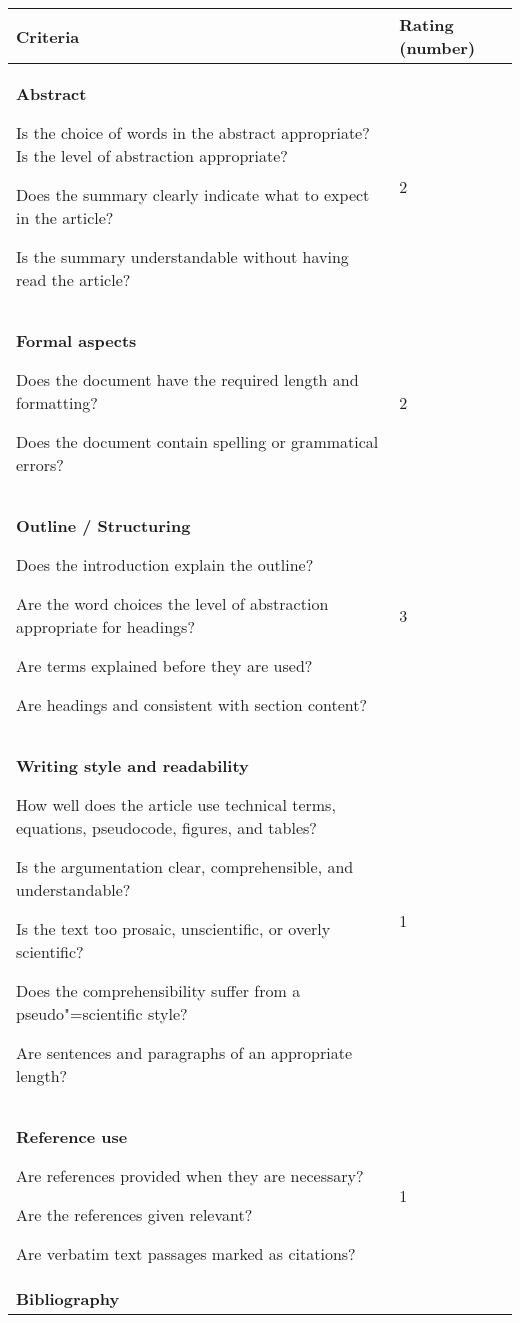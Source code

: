\documentclass[12pt]{scrartcl}
\begin{document}
\begin{longtable}{|p{12cm}|p{2.5cm}|}	
		\hline
			\textbf{Criteria} & \textbf{Rating (number)} \\
		\hline
		\hline
		\endhead
			\textbf{Abstract}
						
                Is the choice of words in the abstract appropriate? Is the
                level of abstraction appropriate?
				
                Does the summary clearly indicate what to expect in the
                article? 
				
                Is the summary understandable without having read the article?			
			& 2 \ \\
		\hline
			\textbf{Formal aspects}
				
				Does the document have the required length and formatting?
				
				Does the document contain spelling or grammatical errors?
			& 2 \ \\
		\hline	
			\textbf{Outline / Structuring}
			
				Does the introduction explain the outline?
				
				Are the word choices the level of abstraction appropriate for headings?
				
				Are terms explained before they are used?
				
				Are headings and consistent with section content?
			& 3 \ \\
		\hline	
			\textbf{Writing style and readability}	%
			
				How well does the article use technical terms, equations, pseudocode, figures, and tables?

				Is the argumentation clear, comprehensible, and understandable?

				Is the text too prosaic, unscientific, or overly scientific?
				
				Does the comprehensibility suffer from a pseudo"=scientific style?

				Are sentences and paragraphs of an appropriate length?
			& 1 \ \\
		\hline	
			\textbf{Reference use}
			
				Are references provided when they are necessary?
				
				Are the references given relevant?
				
				Are verbatim text passages marked as citations?
			& 1 \ \\				
		\hline		
			\textbf{Bibliography}
			

\end{longtable}
\end{document}
